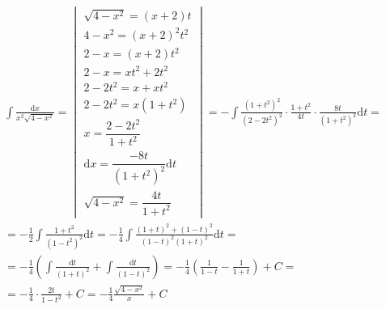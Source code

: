 

\begin{gather*}
\int{\frac{\mbox{d}x}{x^2\sqrt{4-x^2}}} =
\begin{vmatrix}
  \sqrt{4-x^2}=(x+2)t\\
  4-x^2=(x+2)^2t^2\\
  2-x=(x+2)t^2\\
  2-x=xt^2+2t^2\\
  2-2t^2=x+xt^2\\
  2-2t^2=x(1+t^2)\\
  x=\dfrac{2-2t^2}{1+t^2}\\
  \mbox{d}x=\dfrac{-8t}{(1+t^2)^2}\mbox{d}t\\
  \sqrt{4-x^2}=\dfrac{4t}{1+t^2}
\end{vmatrix}
= -\int{\frac{(1+t^2)^2}{(2-2t^2)^2}\cdot\frac{1+t^2}{4t}\cdot\frac{8t}{(1+t^2)^2}\mbox{d}t} = \\
= -\frac{1}{2}\int{\frac{1+t^2}{(1-t^2)^2}\mbox{d}t}
= -\frac{1}{4}\int{\frac{(1+t)^2+(1-t)^2}{(1-t)^2(1+t)^2}\mbox{d}t} = \\
= -\frac{1}{4}\left(\int{\frac{\mbox{d}t}{(1+t)^2}}+\int{\frac{\mbox{d}t}{(1-t)^2}}\right)
= -\frac{1}{4}\left(\frac{1}{1-t}-\frac{1}{1+t}\right)+C = \\
= -\frac{1}{4} \cdot \frac{2t}{1-t^2}+C = -\frac{1}{4}\frac{\sqrt{4-x^2}}{x}+C
\end{gather*}





